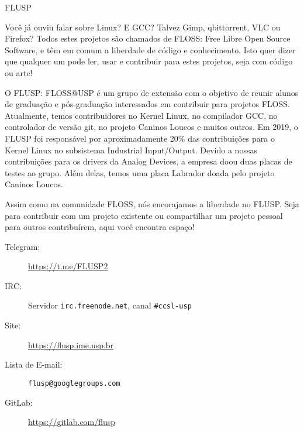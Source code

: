 \begin{subsecao}{FLUSP}


Você já ouviu falar sobre Linux? E GCC? Talvez Gimp, qbittorrent, VLC ou Firefox?
Todos estes projetos são chamados de FLOSS: Free Libre Open Source Software, e
têm em comum a liberdade de código e conhecimento. Isto quer dizer que qualquer
um pode ler, usar e contribuir para estes projetos, seja com código ou arte!

O FLUSP: FLOSS@USP é um grupo de extensão com o objetivo de reunir alunos de
graduação e pós-graduação interessados em contribuir para projetos FLOSS.
Atualmente, temos contribuidores no Kernel Linux, no compilador GCC, no controlador
de versão git, no projeto Caninos Loucos e muitos outros. Em 2019, o FLUSP
foi responsável por aproximadamente 20\% das contribuições para o Kernel Linux no
subsistema Industrial Input/Output. Devido a nossas contribuições para os drivers
da Analog Devices, a empresa doou duas placas de testes ao grupo. Além delas, temos
uma placa Labrador doada pelo projeto Caninos Loucos.

Assim como na comunidade FLOSS, nós encorajamos a liberdade no FLUSP. Seja para
contribuir com um projeto existente ou compartilhar um projeto pessoal para
outros contribuírem, aqui você encontra espaço!

\begin{description}
  \item[Telegram:] \url{https://t.me/FLUSP2}
  \item[IRC:] Servidor \texttt{irc.freenode.net}, canal \texttt{\#ccsl-usp}
  \item[Site:] \url{https://flusp.ime.usp.br}
  \item[Lista de E-mail:] \texttt{flusp@googlegroups.com}
  \item[GitLab:] \url{https://gitlab.com/flusp}
\end{description}

\end{subsecao}
